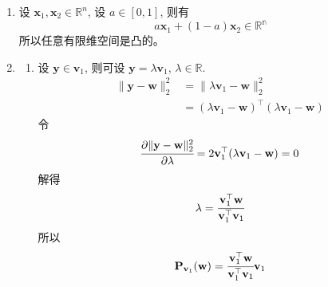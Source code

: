 \documentclass[11pt,letter,notitlepage]{article}
\newcommand{\proj}[2]{\textbf{P}_{#2} (#1)}
\begin{document}
\begin{solution}
	\begin{enumerate}
		\item 设 $\mathbf{x}_1,\mathbf{x}_2 \in \mathbb{R}^n$, 设 $a \in \left[0,1\right]$, 则有
		      $$a\mathbf{x}_1+(1-a)\mathbf{x}_2 \in \mathbb{R^n}$$
		      所以任意有限维空间是凸的。

		\item \begin{enumerate}
			      \item 设 $\mathbf{y} \in \mathbf{v}_1$, 则可设 $\mathbf{y}=\lambda\mathbf{v}_1$, $\lambda\in\mathbb{R}$.
			            $$\begin{aligned}
					            \| \mathbf{y}-\mathbf{w} \|_2^2
					             & = \| \lambda\mathbf{v}_1-\mathbf{w} \|_2^2                               \\
					             & = (\lambda\mathbf{v}_1-\mathbf{w})^\top (\lambda\mathbf{v}_1-\mathbf{w})
				            \end{aligned}$$
			            令
			            $$\cfrac{\partial \| \mathbf{y}-\mathbf{w} \|_2^2}{\partial\lambda}
				            = 2 \mathbf{v}_1^\top (\lambda\mathbf{v}_1-\mathbf{w})
				            = 0$$
			            解得
			            $$\lambda=\cfrac{\mathbf{v}_1^\top \mathbf{w}}{\mathbf{v}_1^\top \mathbf{v}_1}$$
			            所以
			            $$\proj{\mathbf{w}}{\mathbf{v}_1}
				            = \cfrac{\mathbf{v}_1^\top \mathbf{w}}{\mathbf{v}_1^\top \mathbf{v}_1} \mathbf{v}_1 $$


\end{enumerate}
\end{enumerate}
\end{solution}
\end{document}
